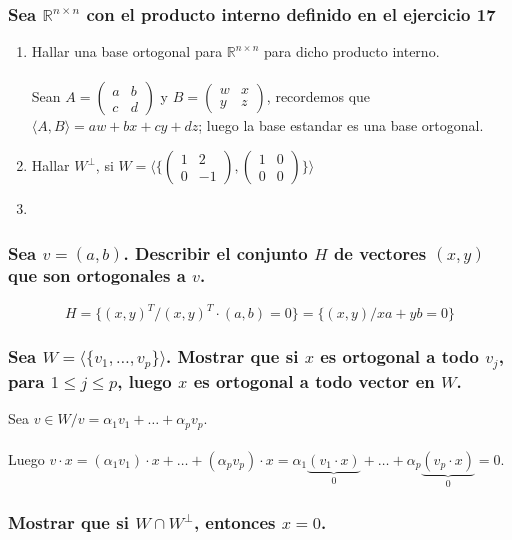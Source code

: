 \documentclass{article}
\begin{document}
\subsubsection{Sea $\mathbb{R}^{n \times n}$ con el producto interno definido en el ejercicio 17}
\begin{enumerate}[1.]
\item
	Hallar una base ortogonal para $\mathbb{R}^{n \times n}$ para dicho producto interno. \\ \\
	Sean $A = \begin{pmatrix}a&b\\c&d\end{pmatrix}$ y $B = \begin{pmatrix}w&x\\y&z\end{pmatrix}$, recordemos que
	$\langle A,B \rangle = aw+bx+cy+dz$; luego la base estandar es una base ortogonal.
\item
	Hallar $W^\bot$, si $W = \Bigg \langle \Bigg \{ \begin{pmatrix}1&2\\0&-1\end{pmatrix}, 
	\begin{pmatrix}1&0\\0&0\end{pmatrix} \Bigg \} \Bigg \rangle$
\item
\end{enumerate}
\subsubsection{Sea $v = (a,b)$. Describir el conjunto $H$ de vectores $(x,y)$ que son ortogonales a $v$.}
\[
H = \{ (x,y)^T / (x,y)^T \cdot (a,b) = 0 \} = \{ (x,y) / xa + yb = 0 \}
\]
\subsubsection{Sea $W = \langle \{ v_1,\dots,v_p \} \rangle$. Mostrar que si $x$ es ortogonal a todo $v_j$,
para $1 \leq j \leq p$, luego $x$ es ortogonal a todo vector en $W$.}
Sea $v \in W / v = \alpha_1 v_1 + \dots + \alpha_p v_p$. \\ \\
Luego $v \cdot x = (\alpha_1 v_1) \cdot x + \dots
+ (\alpha_p v_p) \cdot x = \alpha_1 \underbrace{(v_1 \cdot x)}_0 +\dots+\alpha_p \underbrace{(v_p \cdot x)}_0 = 0$. 
\subsubsection{Mostrar que si $W \cap W^\bot$, entonces $x=0$.}
\end{document}
